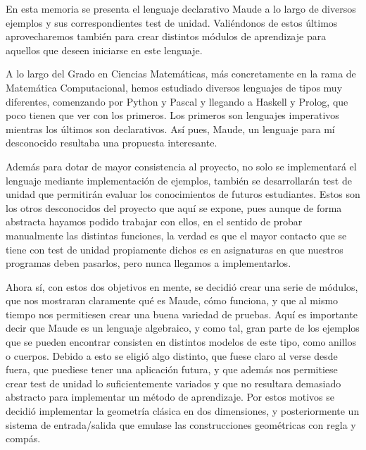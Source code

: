 
En esta memoria se presenta el lenguaje declarativo Maude a lo largo de 
diversos ejemplos y sus correspondientes test de unidad. Valiéndonos de 
estos últimos aprovecharemos también para crear distintos módulos de 
aprendizaje para aquellos que deseen iniciarse en este lenguaje.\par

A lo largo del Grado en Ciencias Matemáticas, más concretamente en la rama de Matemática Computacional, hemos estudiado diversos lenguajes de tipos muy diferentes, comenzando por Python y Pascal y llegando a Haskell y Prolog, que poco tienen que ver con los primeros. Los primeros son lenguajes imperativos mientras los últimos son declarativos. Así pues, Maude, un lenguaje para mí desconocido resultaba una propuesta interesante.\par

Además para dotar de mayor consistencia al proyecto, no solo se implementará el lenguaje mediante implementación de ejemplos, también se desarrollarán test de unidad que permitirán evaluar los conocimientos de futuros estudiantes. Estos son los otros desconocidos del proyecto que aquí se expone, pues aunque de forma abstracta hayamos podido trabajar con ellos, en el sentido de probar manualmente las distintas funciones, la verdad es que el mayor contacto que se tiene con test de unidad propiamente dichos es en asignaturas en que nuestros programas deben pasarlos, pero nunca llegamos a implementarlos. \par

Ahora sí, con estos dos objetivos en mente, se decidi\'o crear una serie de módulos, que nos mostraran claramente qué es Maude, cómo funciona, y que al mismo tiempo nos permitiesen crear una buena variedad de pruebas. Aquí es importante decir que Maude es un lenguaje algebraico, y como tal, gran parte de los ejemplos que se pueden encontrar consisten en distintos modelos de este tipo, como anillos o cuerpos. Debido a esto se eligió algo distinto, que fuese claro al verse desde fuera, que puediese tener una aplicación futura, y que además nos permitiese crear test de unidad lo suficientemente variados y que no resultara demasiado abstracto para implementar un método de aprendizaje. Por estos motivos se decidió implementar la geometría clásica en dos dimensiones, y posteriormente un sistema de entrada/salida que emulase las construcciones geométricas con regla y compás. \par

